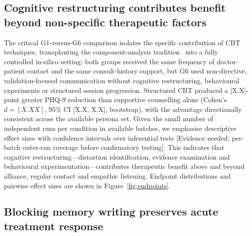 \documentclass[sn-nature,pdflatex]{sn-jnl}
\begin{document}
\subsection*{Cognitive restructuring contributes benefit beyond non-specific therapeutic factors}

The critical G1-versus-G6 comparison isolates the specific contribution of CBT techniques, transplanting the component-analysis tradition~\cite{jacobson1996} into a fully controlled in-silico setting: both groups received the same frequency of doctor--patient contact and the same consult-history support, but G6 used non-directive, validation-focused communication without cognitive restructuring, behavioural experiments or structured session progression. Structured CBT produced a [X.X]-point greater PHQ-9 reduction than supportive counselling alone (Cohen's $d = [X.XX]$, 95\% CI [X.X, X.X], bootstrap), with the advantage directionally consistent across the available persona set. Given the small number of independent runs per condition in available batches, we emphasise descriptive effect sizes with confidence intervals over inferential tests [Evidence needed: per-batch outer-run coverage before confirmatory testing]. This indicates that cognitive restructuring---distortion identification, evidence examination and behavioural experimentation---contributes therapeutic benefit above and beyond alliance, regular contact and empathic listening. Endpoint distributions and pairwise effect sizes are shown in Figure~\ref{fig:endpoints}.

\subsection*{Blocking memory writing preserves acute treatment response}
\end{document}
